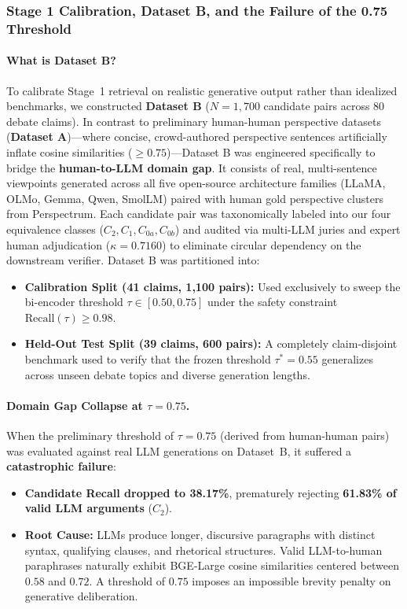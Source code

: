 \documentclass[11pt,a4paper]{article}
\begin{document}
\subsubsection{Stage 1 Calibration, Dataset B, and the Failure of the 0.75 Threshold}
\paragraph{What is Dataset B?} To calibrate Stage~1 retrieval on realistic generative output rather than idealized benchmarks, we constructed \textbf{Dataset B} ($N = 1,700$ candidate pairs across 80 debate claims). In contrast to preliminary human-human perspective datasets (\textbf{Dataset A})---where concise, crowd-authored perspective sentences artificially inflate cosine similarities ($\ge 0.75$)---Dataset B was engineered specifically to bridge the \textbf{human-to-LLM domain gap}. It consists of real, multi-sentence viewpoints generated across all five open-source architecture families (LLaMA, OLMo, Gemma, Qwen, SmolLM) paired with human gold perspective clusters from Perspectrum. Each candidate pair was taxonomically labeled into our four equivalence classes ($C_2, C_1, C_{0a}, C_{0b}$) and audited via multi-LLM juries and expert human adjudication ($\kappa = 0.7160$) to eliminate circular dependency on the downstream verifier. Dataset B was partitioned into:
\begin{itemize}[leftmargin=*,itemsep=1pt]
    \item \textbf{Calibration Split (41 claims, 1,100 pairs):} Used exclusively to sweep the bi-encoder threshold $\tau \in [0.50, 0.75]$ under the safety constraint $\text{Recall}(\tau) \ge 0.98$.
    \item \textbf{Held-Out Test Split (39 claims, 600 pairs):} A completely claim-disjoint benchmark used to verify that the frozen threshold $\tau^* = 0.55$ generalizes across unseen debate topics and diverse generation lengths.
\end{itemize}

\paragraph{Domain Gap Collapse at $\tau = 0.75$.} When the preliminary threshold of $\tau = 0.75$ (derived from human-human pairs) was evaluated against real LLM generations on Dataset~B, it suffered a \textbf{catastrophic failure}:
\begin{itemize}[leftmargin=*,itemsep=1pt]
    \item \textbf{Candidate Recall dropped to 38.17\%}, prematurely rejecting \textbf{61.83\% of valid LLM arguments} ($C_2$).
    \item \textbf{Root Cause:} LLMs produce longer, discursive paragraphs with distinct syntax, qualifying clauses, and rhetorical structures. Valid LLM-to-human paraphrases naturally exhibit BGE-Large cosine similarities centered between $0.58$ and $0.72$. A threshold of $0.75$ imposes an impossible brevity penalty on generative deliberation.
\end{itemize}
\end{document}

